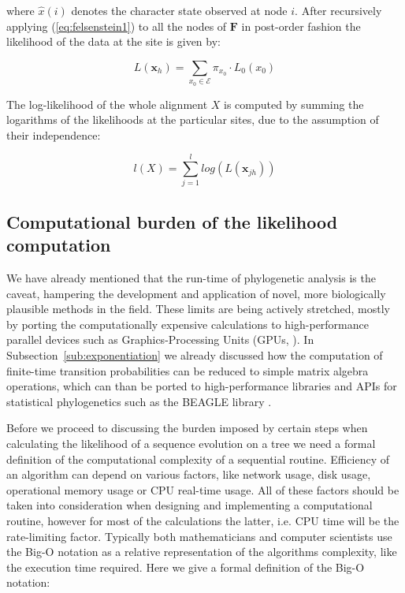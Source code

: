 \noindent
where $\hat{x}(i)$ denotes the character state observed at node $i$.
After recursively applying (\ref{eq:felsenstein1}) to all the nodes of $\mathbf{F}$ in post-order fashion the likelihood of the data at the site is given by:

\begin{equation}
L(\mathbf{x}_{h})=\underset{x_{0}\in\mathcal{E}}{\sum}\pi_{x_{0}}\cdot L_{0}(x_{0})
\label{eq:felsenstein3}
\end{equation}

\noindent
The log-likelihood of the whole alignment $X$ is computed by summing the logarithms of the likelihoods at the particular sites, due to the assumption of their independence:

\begin{equation}
l(X)=\underset{j=1}{\overset{l}{\sum}}log\left(L(\mathbf{x}_{jh})\right)
\label{eq:loglikelihood}
\end{equation}

\subsection{Computational burden of the likelihood computation}

We have already mentioned that the run-time of phylogenetic analysis is the caveat, hampering the development and application of novel, more biologically plausible methods in the field.
These limits are being actively stretched, mostly by porting the computationally expensive calculations to high-performance parallel devices such as Graphics-Processing Units (GPUs, \cite{Nickolls2008}).
In Subsection~\ref{sub:exponentiation} we already discussed how the computation of finite-time transition probabilities can be reduced to simple matrix algebra operations, which can than be ported to high-performance libraries and APIs for statistical phylogenetics such as the BEAGLE library \citep{Ayres2012, Suchard2009}. 

Before we proceed to discussing the burden imposed by certain steps when calculating the likelihood of a sequence evolution on a tree we need a formal definition of the computational complexity of a sequential routine.
Efficiency of an algorithm can depend on various factors, like network usage, disk usage, operational memory usage or CPU real-time usage.
All of these factors should be taken into consideration when designing and implementing a computational routine, however for most of the calculations the latter, i.e. CPU time will be the rate-limiting factor.
Typically both mathematicians and computer scientists use the Big-O notation as a relative representation of the algorithms complexity, like the execution time required.
Here we give a formal definition of the Big-O notation:

